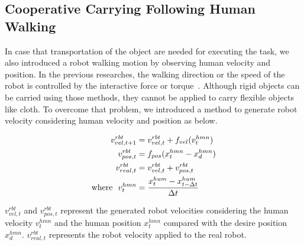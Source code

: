 \subsection{Cooperative Carrying Following Human Walking}
\label{subsec:walk}
In case that transportation of the object are needed for executing the task, we also introduced a robot walking motion by observing human velocity and position. In the previous researches, the walking direction or the speed of the robot is controlled by the interactive force or torque~\cite{aist_cooperative_carrying}\cite{carry_table}. Although rigid objects can be carried using those methods, they cannot be applied to carry flexible objects like cloth. To overcome that problem, we introduced a method to generate robot velocity considering human velocity and position as below.

\begin{align}
v^{rbt}_{vel, t+1} &= v^{rbt}_{vel, t} + f_{vel}(v^{hmn}_t) \label{equation:v_vel}\\
v^{rbt}_{pos, t} &= f_{pos}(x^{hmn}_t-x^{hmn}_{d}) \label{equation:v_pos}\\
v^{rbt}_{real, t} &= v^{rbt}_{vel,t} + v^{rbt}_{pos,t} \label{equation:v_real}\\
{\rm where} \ \ v^{hmn}_{t} &= \frac{x^{hum}_{t} - x^{hum}_{t-\Delta t}}{\Delta t} \nonumber
\end{align}

\(v^{rbt}_{vel, t}\) and \(v^{rbt}_{pos, t}\) represent the generated robot velocities considering the human velocity \(v^{hmn}_{t}\) and the human position \(x^{hmn}_{t}\) compared with the desire position \(x^{hmn}_{d}\). \(v^{rbt}_{real, t}\) represents the robot velocity applied to the real robot.%

